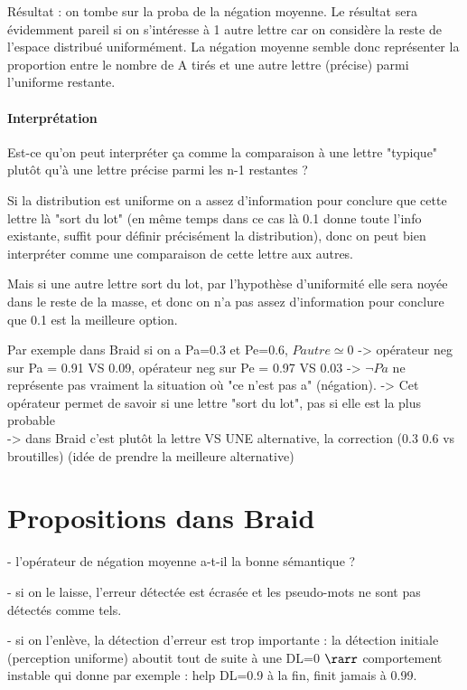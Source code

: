 \documentclass{article}
\begin{document}
  Résultat : on tombe sur la proba de la négation moyenne. 
  Le résultat sera évidemment pareil si on s'intéresse à 1 autre lettre car on considère la reste de l'espace distribué uniformément.
  La négation moyenne semble donc représenter la proportion entre le nombre de A tirés et une autre lettre (précise) parmi l'uniforme restante.

  
\paragraph{Interprétation}
    Est-ce qu'on peut interpréter ça comme la comparaison à une lettre "typique" plutôt qu'à une lettre précise parmi les n-1 restantes ?
    
  Si la distribution est uniforme on a assez d'information pour conclure que cette lettre là "sort du lot" (en même temps dans ce cas là 0.1 donne toute l'info existante, suffit pour définir précisément la distribution), donc on peut bien interpréter comme une comparaison de cette lettre aux autres.
  
  Mais si une autre lettre sort du lot, par l'hypothèse d'uniformité elle sera noyée dans le reste de la masse, et donc on n'a pas assez d'information pour conclure que 0.1 est la meilleure option. 
  
  Par exemple dans Braid si on a Pa=0.3 et Pe=0.6, $Pautre\simeq 0$ -> opérateur neg sur Pa = 0.91 VS 0.09, opérateur neg sur Pe = 0.97 VS 0.03
  -> $\neg Pa$ ne représente pas vraiment la situation où "ce n'est pas a" (négation). 
  -> Cet opérateur permet de savoir si une lettre "sort du lot", pas si elle est la plus probable \\
  -> dans Braid c'est plutôt la lettre VS UNE alternative, la correction (0.3 0.6 vs broutilles) (idée de prendre la meilleure alternative)\\


  
 \section{Propositions dans Braid}
  
  - l'opérateur de négation moyenne a-t-il la bonne sémantique ?
  
  - si on le laisse, l'erreur détectée est écrasée et les pseudo-mots ne sont pas détectés comme tels.
  
  - si on l'enlève, la détection d'erreur est trop importante : la détection initiale (perception uniforme) aboutit tout de suite à une DL=0 $\rarr$  comportement instable qui donne par exemple : help DL=0.9 à la fin, finit jamais à 0.99.
\end{document}

